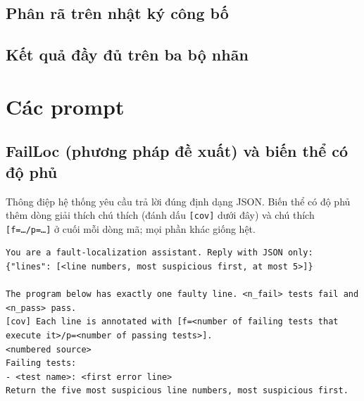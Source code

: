 \subsection{Phân rã trên nhật ký công bố}

\begin{table}[H]
\centering
\caption{Phân rã Shapley trên nhật ký công bố của tác giả (dòng lỗi chuẩn gốc)}
\label{tab:phan-ra-cong-bo}
\resizebox{\linewidth}{!}{}
\end{table}

\subsection{Kết quả đầy đủ trên ba bộ nhãn}

\begin{table}[H]
\centering
\caption{RQ2 và RQ3 đầy đủ: mọi biến thể trên ba bộ nhãn (tập test, Gemini 3.8 Flash, 3 lần chạy; $\Delta$ so với SemLoc)}
\label{tab:rq2-day-du}
\end{table}

\section{Các prompt}
\label{sec:prompt}

\subsection{FailLoc (phương pháp đề xuất) và biến thể có độ phủ}

Thông điệp hệ thống yêu cầu trả lời đúng định dạng JSON. Biến thể có độ phủ thêm dòng giải thích chú thích (đánh dấu
\texttt{[cov]} dưới đây) và chú thích \texttt{[f=…/p=…]} ở cuối mỗi dòng mã; mọi phần khác giống hệt.
\begin{lstlisting}[numbers=none]
You are a fault-localization assistant. Reply with JSON only:
{"lines": [<line numbers, most suspicious first, at most 5>]}

The program below has exactly one faulty line. <n_fail> tests fail and <n_pass> pass.
[cov] Each line is annotated with [f=<number of failing tests that execute it>/p=<number of passing tests>].
<numbered source>
Failing tests:
- <test name>: <first error line>
Return the five most suspicious line numbers, most suspicious first.
\end{lstlisting}

